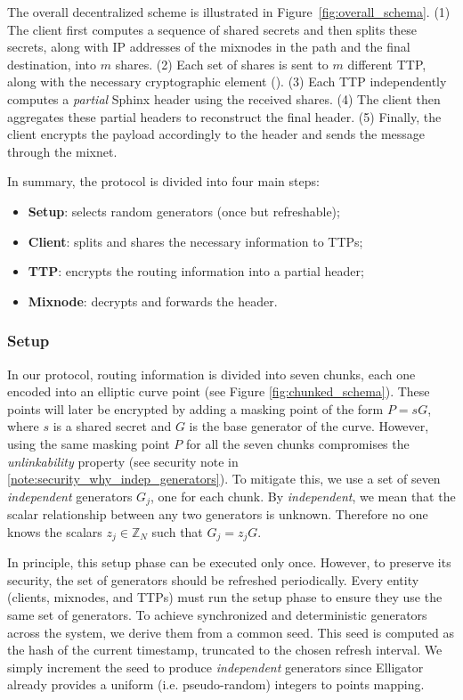 The overall decentralized scheme is illustrated in Figure~\ref{fig:overall_schema}.  
(1) The client first computes a sequence of shared secrets and then splits these secrets, along with IP addresses of the mixnodes in the path and the final destination, into $m$ shares.  
(2) Each set of shares is sent to $m$ different TTP, along with the necessary cryptographic element (\A{}).  
(3) Each TTP independently computes a \textit{partial} Sphinx header using the received shares.  
(4) The client then aggregates these partial headers to reconstruct the final header. 
(5) Finally, the client encrypts the payload accordingly to the header and sends the message through the mixnet.


\noindent In summary, the protocol is divided into four main steps:
\begin{itemize}
    \item \textbf{Setup}: selects random generators (once but refreshable);
    \item \textbf{Client}: splits and shares the necessary information to TTPs;
    \item \textbf{TTP}: encrypts the routing information into a partial header;
    \item \textbf{Mixnode}: decrypts and forwards the header.
\end{itemize}


\subsubsection{Setup}

In our protocol, routing information is divided into seven chunks, each one encoded into an elliptic curve point (see Figure \ref{fig:chunked_schema}). 
These points will later be encrypted by adding a masking point of the form $ P = s G $, where $ s $ is a shared secret and $ G $ is the base generator of the curve.
However, using the same masking point $ P $ for all the seven chunks compromises the \textit{unlinkability} property
(see security note in \ref{note:security_why_indep_generators}).
To mitigate this, we use a set of seven \textit{independent} generators $ G_j $, one for each chunk. 
By \textit{independent}, we mean that the scalar relationship between any two generators is unknown. 
Therefore no one knows the scalars $ z_j \in \mathbb{Z}_N $ such that $ G_j = z_j G $.

In principle, this setup phase can be executed only once. 
However, to preserve its security, the set of generators should be refreshed periodically. 
Every entity (clients, mixnodes, and TTPs) must run the setup phase to ensure they use the same set of generators.
To achieve synchronized and deterministic generators across the system, we derive them from a common seed. 
This seed is computed as the hash of the current timestamp, truncated to the chosen refresh interval. 
We simply increment the seed to produce \textit{independent} generators since Elligator already provides a uniform (i.e. pseudo-random) integers to points mapping.

